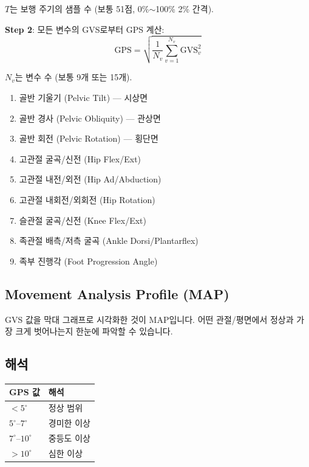 \documentclass[11pt, a4paper]{report}
\begin{document}
$T$는 보행 주기의 샘플 수 (보통 51점, 0\%$\sim$100\% 2\% 간격).

\textbf{Step 2}: 모든 변수의 GVS로부터 GPS 계산:
\begin{equation}
\boxed{
\text{GPS} = \sqrt{\frac{1}{N_v} \sum_{v=1}^{N_v} \text{GVS}_v^2}
}
\label{eq:gps}
\end{equation}

$N_v$는 변수 수 (보통 9개 또는 15개).

\begin{biomechbox}[title={표준 GPS 변수 (9개)}]
\begin{enumerate}[leftmargin=*]
  \item 골반 기울기 (Pelvic Tilt) --- 시상면
  \item 골반 경사 (Pelvic Obliquity) --- 관상면
  \item 골반 회전 (Pelvic Rotation) --- 횡단면
  \item 고관절 굴곡/신전 (Hip Flex/Ext)
  \item 고관절 내전/외전 (Hip Ad/Abduction)
  \item 고관절 내회전/외회전 (Hip Rotation)
  \item 슬관절 굴곡/신전 (Knee Flex/Ext)
  \item 족관절 배측/저측 굴곡 (Ankle Dorsi/Plantarflex)
  \item 족부 진행각 (Foot Progression Angle)
\end{enumerate}
\end{biomechbox}

\subsection{Movement Analysis Profile (MAP)}

GVS 값을 막대 그래프로 시각화한 것이 MAP입니다. 어떤 관절/평면에서 정상과 가장 크게 벗어나는지 한눈에 파악할 수 있습니다.

\subsection{해석}

\begin{center}
\renewcommand{\arraystretch}{1.3}
\begin{tabular}{ll}
\toprule
\textbf{GPS 값} & \textbf{해석} \\
\midrule
$< 5^\circ$ & 정상 범위 \\
$5^\circ$--$7^\circ$ & 경미한 이상 \\
$7^\circ$--$10^\circ$ & 중등도 이상 \\
$> 10^\circ$ & 심한 이상 \\
\bottomrule
\end{tabular}
\end{center}
\end{document}
